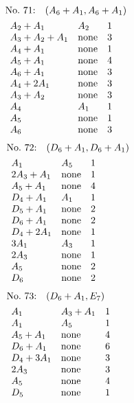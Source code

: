%
%
\begin{align*}
&\hbox to 4cm {\textrm{No.~71:}\quad$(A_{6}+A_{1}, A_{6}+A_{1})$\hss}\\ 
&\begin{array}{lll}
A_{2}+A_{1} & A_{2} & 1\\
A_{3}+A_{2}+A_{1} & \none & 3\\
A_{4}+A_{1} & \none & 1\\
A_{5}+A_{1} & \none & 4\\
A_{6}+A_{1} & \none & 3\\
A_{4}+2A_{1} & \none & 3\\
A_{3}+A_{2} & \none & 3\\
A_{4} & A_{1} & 1\\
A_{5} & \none & 1\\
A_{6} & \none & 3\\
\end{array}
\end{align*}
%
%
\begin{align*}
&\hbox to 4cm {\textrm{No.~72:}\quad$(D_{6}+A_{1}, D_{6}+A_{1})$\hss}\\ 
&\begin{array}{lll}
A_{1} & A_{5} & 1\\
2A_{3}+A_{1} & \none & 1\\
A_{5}+A_{1} & \none & 4\\
D_{4}+A_{1} & A_{1} & 1\\
D_{5}+A_{1} & \none & 2\\
D_{6}+A_{1} & \none & 2\\
D_{4}+2A_{1} & \none & 1\\
3A_{1} & A_{3} & 1\\
2A_{3} & \none & 1\\
A_{5} & \none & 2\\
D_{6} & \none & 2\\
\end{array}
\end{align*}
%
%
\begin{align*}
&\hbox to 4cm {\textrm{No.~73:}\quad$(D_{6}+A_{1}, E_{7})$\hss}\\ 
&\begin{array}{lll}
A_{1} & A_{3}+A_{1} & 1\\
A_{1} & A_{5} & 1\\
A_{5}+A_{1} & \none & 4\\
D_{6}+A_{1} & \none & 6\\
D_{4}+3A_{1} & \none & 3\\
2A_{3} & \none & 3\\
A_{5} & \none & 4\\
D_{5} & \none & 1\\
\end{array}
\end{align*}
